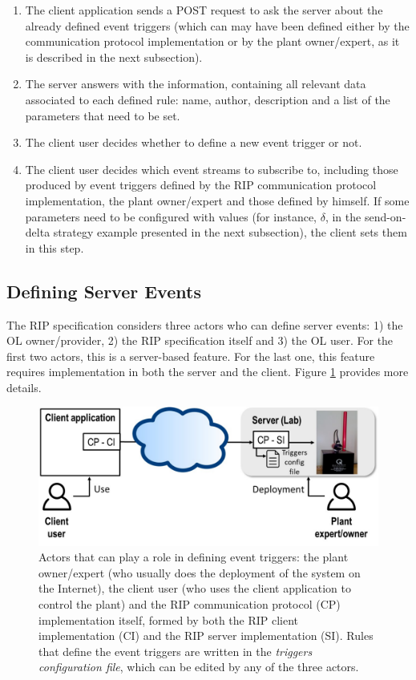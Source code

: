 \begin{enumerate}
	\item The client application sends a POST request to ask the server about the already defined event triggers (which can may have been defined either by the communication protocol implementation or by the plant owner/expert, as it is described in the next subsection). 
	\item The server answers with the information, containing all relevant data associated to each defined rule: name, author, description and a list of the parameters that need to be set. 
	\item The client user decides whether to define a new event trigger or not.
	\item The client user decides which event streams to subscribe to, including those produced by event triggers defined by the RIP communication protocol implementation, the plant owner/expert and those defined by himself. If some parameters need to be configured with values (for instance, $\delta$, in the send-on-delta strategy example presented in the next subsection), the client sets them in this step.
\end{enumerate}

\subsection{Defining Server Events}
The RIP specification considers three actors who can define server events: 1) the OL owner/provider, 2) the RIP specification itself and 3) the OL user. For the first two actors, this is a server-based feature. For the last one, this feature requires implementation in both the server and the client. Figure \ref{fig:actors} provides more details.

\begin{figure}[b!]
\begin{center}
\centering
\includegraphics[width=\columnwidth]{images/actors.pdf}
\caption{Actors that can play a role in defining event triggers: the plant owner/expert (who usually does the deployment of the system on the Internet), the client user (who uses the client application to control the plant) and the RIP communication protocol (CP) implementation itself, formed by both the RIP client implementation (CI) and the RIP server implementation (SI). Rules that define the event triggers are written in the \textit{triggers configuration file}, which can be edited by any of the three actors.}
\label{fig:actors}
\end{center}
\end{figure}

